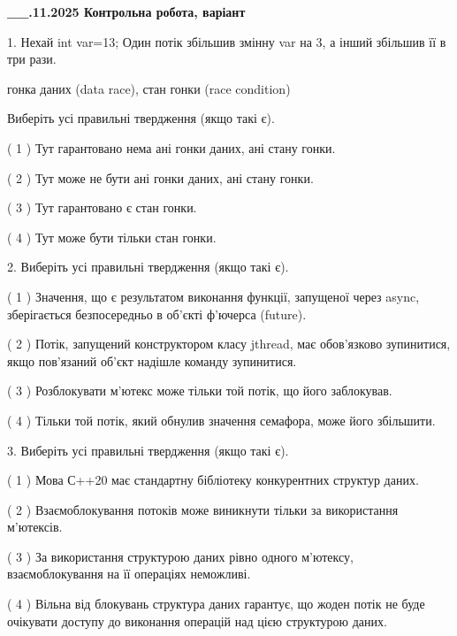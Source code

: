 \documentclass[12pt, ukrainian]{article}
\begin{document}
\newpage
\begin {large}

\textbf{\_\_.11.2025 Контрольна робота, варіант  }\par


{
1. Нехай int var=13; Один потік збільшив змінну var на 3, а інший збільшив її в три рази.

гонка даних (data race), стан гонки (race condition)

Виберіть усі правильні твердження (якщо такі є).\par
\vspace{2mm}
( 1 ) Тут гарантовано нема ані гонки даних, ані стану гонки.%

( 2 ) Тут може не бути ані гонки даних, ані стану гонки.%

( 3 ) Тут гарантовано є стан гонки.%

( 4 ) Тут може бути тільки стан гонки.%


2. Виберіть усі правильні твердження (якщо такі є).\par
\vspace{2mm}

( 1 ) Значення, що є результатом виконання функції, запущеної через async, зберігається безпосередньо в об’єкті ф’ючерса (future).%

( 2 ) Потік, запущений конструктором класу jthread, має обов’язково зупинитися, якщо пов’язаний об’єкт надішле команду зупинитися.%

( 3 ) Розблокувати м’ютекс може тільки той потік, що його заблокував.%

( 4 ) Тільки той потік, який обнулив значення семафора, може його збільшити.%


3. Виберіть усі правильні твердження (якщо такі є).\par
\vspace{2mm}

( 1 ) Мова С++20 має стандартну бібліотеку конкурентних структур даних.%

( 2 ) Взаємоблокування потоків може виникнути тільки за використання м’ютексів.%

( 3 ) За використання структурою даних рівно одного м’ютексу, взаємоблокування на її операціях неможливі.%

( 4 ) Вільна від блокувань структура даних гарантує, що жоден потік не буде очікувати доступу до виконання операцій над цією структурою даних.%


}
\end{large}
\end{document}
